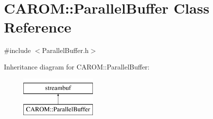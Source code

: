 \hypertarget{class_c_a_r_o_m_1_1_parallel_buffer}{\section{C\-A\-R\-O\-M\-:\-:Parallel\-Buffer Class Reference}
\label{class_c_a_r_o_m_1_1_parallel_buffer}
}


{\ttfamily \#include $<$Parallel\-Buffer.\-h$>$}

Inheritance diagram for C\-A\-R\-O\-M\-:\-:Parallel\-Buffer\-:\begin{figure}[H]
\begin{center}
\leavevmode
\includegraphics[height=2.000000cm]{class_c_a_r_o_m_1_1_parallel_buffer}
\end{center}
\end{figure}
